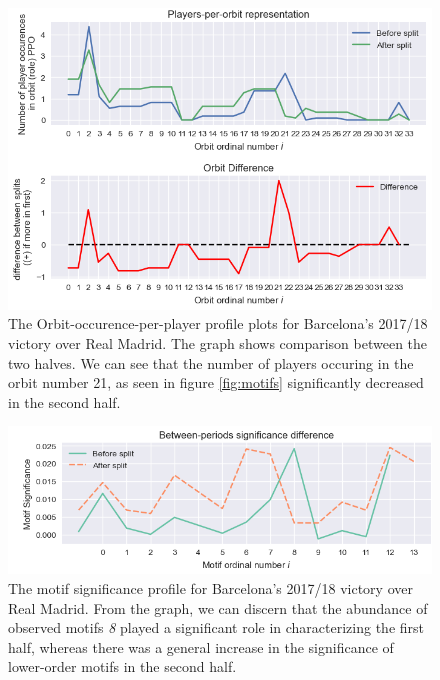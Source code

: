 \documentclass[9pt,twocolumn,twoside]{pnas-report}
\begin{document}
\begin{figure}[t]\centering
	\includegraphics[width=\linewidth]{barcaopp.png}
	\caption{The Orbit-occurence-per-player profile plots for Barcelona's 2017/18 victory over Real Madrid. The graph shows comparison between the two halves. We can see that the number of players occuring in the orbit number 21, as seen in figure \ref{fig:motifs} significantly decreased in the second half.}
	\label{fig:BarcaOPP}
\end{figure}

\begin{figure}[t]\centering
	\includegraphics[width=\linewidth]{barcasignif.png}
	\caption{The motif significance profile for Barcelona's 2017/18 victory over Real Madrid. From the graph, we can discern that the abundance of observed motifs \textit{8} played a significant role in characterizing the first half, whereas there was a general increase in the significance of lower-order motifs in the second half.}
	\label{fig:Barca Significance}
\end{figure}
\end{document}
